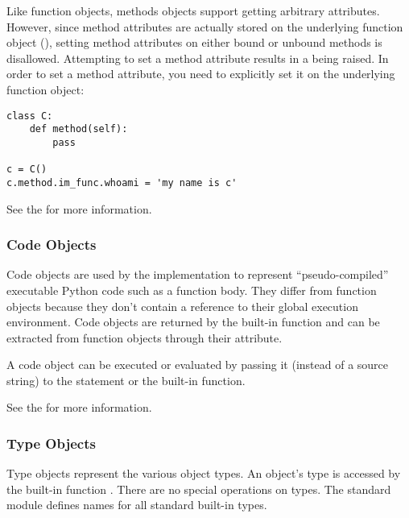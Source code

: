 Like function objects, methods objects support getting
arbitrary attributes.  However, since method attributes are actually
stored on the underlying function object (),
setting method attributes on either bound or unbound methods is
disallowed.  Attempting to set a method attribute results in a
 being raised.  In order to set a method attribute,
you need to explicitly set it on the underlying function object:

\begin{verbatim}
class C:
    def method(self):
        pass

c = C()
c.method.im_func.whoami = 'my name is c'
\end{verbatim}

See the  for more
information.


\subsubsection{Code Objects \label{bltin-code-objects}}

Code objects are used by the implementation to represent
``pseudo-compiled'' executable Python code such as a function body.
They differ from function objects because they don't contain a
reference to their global execution environment.  Code objects are
returned by the built-in  function and can be
extracted from function objects through their 
attribute.

A code object can be executed or evaluated by passing it (instead of a
source string) to the  statement or the built-in
 function.

See the  for more
information.


\subsubsection{Type Objects \label{bltin-type-objects}}

Type objects represent the various object types.  An object's type is
accessed by the built-in function .  There are no special
operations on types.  The standard module  defines names
for all standard built-in types.

